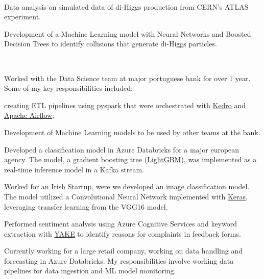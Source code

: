 \documentclass[a4paper]{MagicalCV}
\begin{document}
\begin{minipage}[t]{0.66\textwidth} 


 \\
\vspace{\topsep} %
\begin{tightemize}
    \item Data analysis on simulated data of di-Higgs production from CERN's ATLAS experiment.
    \item Development of a Machine Learning model with Neural Networks and Boosted Decision Trees to identify collisions that generate di-Higgs particles.
\end{tightemize}
\sectionsep

 \\
\vspace{\topsep} %
\begin{tightemize}
    \item Worked with the Data Science team at major portuguese bank for over 1 year. Some of my key responsibilities included:
    \begin{tightemize}
        \item  creating ETL pipelines using pyspark that were orchestrated with \href{https://kedro.readthedocs.io/en/stable/index.html}{Kedro} and \href{https://airflow.apache.org}{Apache Airflow};
        \item Development of Machine Learning models to be used by other teams at the bank.
    \end{tightemize}
    \item Developed a classification model in Azure Databricks for a major european agency. The model, a gradient boosting tree (\href{https://lightgbm.readthedocs.io/en/latest/}{LightGBM}), was implemented as a real-time inference model in a Kafka stream.
    \item Worked for an Irish Startup, were we developed an image classification model. The model utilized a Convolutional Neural Network implemented with \href{https://keras.io/}{Keras}, leveraging transfer learning from the VGG16 model.
    \item Performed sentiment analysis using Azure Cognitive Services and keyword extraction with \href{http://yake.inesctec.pt/}{YAKE} to identify reasons for complaints in feedback forms.
    \item Currently working for a large retail company, working on data handling and forecasting in Azure Databricks. My responsibilities involve working data pipelines for data ingestion and ML model monitoring.
\end{tightemize}
\sectionsep


\end{minipage}
\end{document}

